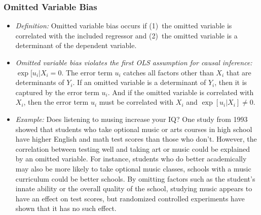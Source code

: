 

\begin{frame}
\frametitle{Omitted Variable Bias}
\begin{itemize}
\item \emph{Definition:}
Omitted variable bias occurs if (1)~the omitted variable is correlated with the included regressor and (2)~the omitted variable is a determinant of the dependent variable. 
\item \emph{Omitted variable bias violates the first OLS assumption for causal inference:}\\ 
$\exp[u_{i}|X_{i}=0$.
The error term $u_{i}$ catches all factors other than $X_{i}$ that are determinants of $Y_{i}$. If an omitted variable is a determinant of $Y_{i}$, then it is captured by the error term $u_{i}$. And if the omitted variable is correlated with $X_{i}$, then the error term $u_{i}$ must be correlated with $X_{i}$ and $\exp[u_{i}|X_{i}]\ne 0$.
\item \emph{Example:} Does listening to musing increase your IQ? One study from 1993 showed that students who take optional music or arts courses in high school have higher English and math test scores than those who don't. However, the correlation between testing well and taking art or music could be explained by an omitted variable. For instance, students who do better academically may also be more likely to take optional music classes, schools with a music curriculum could be better schools. By omitting factors such as the student's innate ability or the overall quality of the school, studying music appears to have an effect on test scores, but randomized controlled experiments have shown that it has no such effect.
\end{itemize}
\end{frame}


